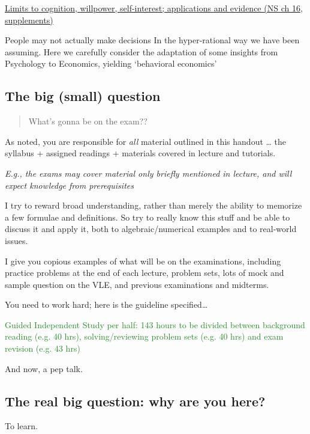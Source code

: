 \documentclass[]{article}
\begin{document}
\underline{Limits to cognition, willpower, self-interest; applications and evidence (NS ch 16, supplements)}

People may not actually make decisions In the hyper-rational way we have
been assuming. Here we carefully consider the adaptation of some
insights from Psychology to Economics, yielding `behavioral economics'

\hypertarget{the-big-small-question}{%
\subsection{The big (small) question}\label{the-big-small-question}}

\begin{quote}
What's gonna be on the exam??
\end{quote}

As noted, you are responsible for \emph{all} material outlined in this
handout \ldots{} the syllabus + assigned readings + materials covered in
lecture and tutorials.

\emph{E.g., the exams may cover material only briefly mentioned in
lecture, and will expect knowledge from prerequisites}

I try to reward broad understanding, rather than merely the ability to
memorize a few formulae and definitions. So try to really know this
stuff and be able to discuss it and apply it, both to
algebraic/numerical examples and to real-world issues.

I give you copious examples of what will be on the examinations,
including practice problems at the end of each lecture, problem sets,
lots of mock and sample question on the VLE, and previous examinations
and midterms.

You need to work hard; here is the guideline specified\ldots{}

\textcolor{ForestGreen}{\small{Guided Independent Study per half: 143 hours to be divided between background reading (e.g. 40 hrs), solving/reviewing problem sets (e.g. 40 hrs) and exam revision (e.g. 43 hrs)}}

And now, a pep talk.

\hypertarget{the-real-big-question-why-are-you-here}{%
\subsection{The real big question: why are you
here?}\label{the-real-big-question-why-are-you-here}}

To learn.
\end{document}
